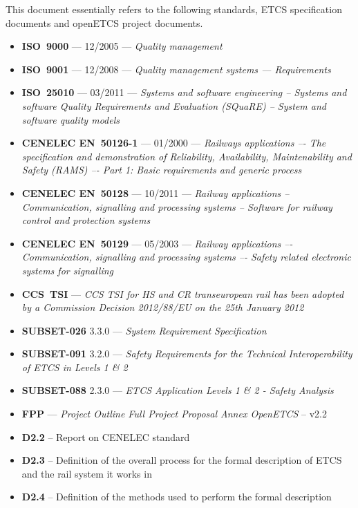 \documentclass{template/openetcs_report}
\begin{document}
This document essentially refers to the following standards, ETCS specification documents and openETCS project documents.

\begin{itemize}
\item \textbf{ISO~9000} --- 12/2005 --- \emph{Quality management}
\item \textbf{ISO~9001} --- 12/2008 --- \emph{Quality management systems — Requirements}
\item \textbf{ISO~25010} --- 03/2011 --- \emph{Systems and software engineering -- Systems and software Quality Requirements and Evaluation (SQuaRE) -- System and software quality models}
\item \textbf{CENELEC EN~50126-1} --- 01/2000 --- \emph{Railways applications –- The specification and 
demonstration of Reliability, Availability, Maintenability and Safety (RAMS) –- Part 1: 
Basic requirements and generic process}
\item \textbf{CENELEC EN~50128} --- 10/2011 --- \emph{Railway applications -- Communication, signalling and 
processing systems -- Software for railway control and protection systems}
\item \textbf{CENELEC EN~50129} --- 05/2003 --- \emph{Railway applications –- Communication, signalling and 
processing systems –- Safety related electronic systems for signalling}
\item \textbf{CCS~TSI} --- \emph{ CCS TSI for HS and CR transeuropean rail has been adopted by a Commission Decision 2012/88/EU on the 25th January 2012}
\item \textbf{SUBSET-026} 3.3.0 --- \emph{System Requirement Specification}
\item \textbf{SUBSET-091} 3.2.0 --- \emph{Safety Requirements for the Technical Interoperability
of ETCS in Levels 1 \& 2}
\item \textbf{SUBSET-088} 2.3.0 --- \emph{ETCS Application Levels 1 \& 2 - Safety Analysis}
\item \textbf{FPP} --- \emph{Project Outline Full Project Proposal Annex OpenETCS} -- v2.2
\item \textbf{D2.2} -- Report on CENELEC standard
\item \textbf{D2.3} -- Definition of the overall process for the formal description of ETCS and the rail system it works in 
\item \textbf{D2.4} -- Definition of the methods used to perform the formal description
\end{itemize}
\end{document}
